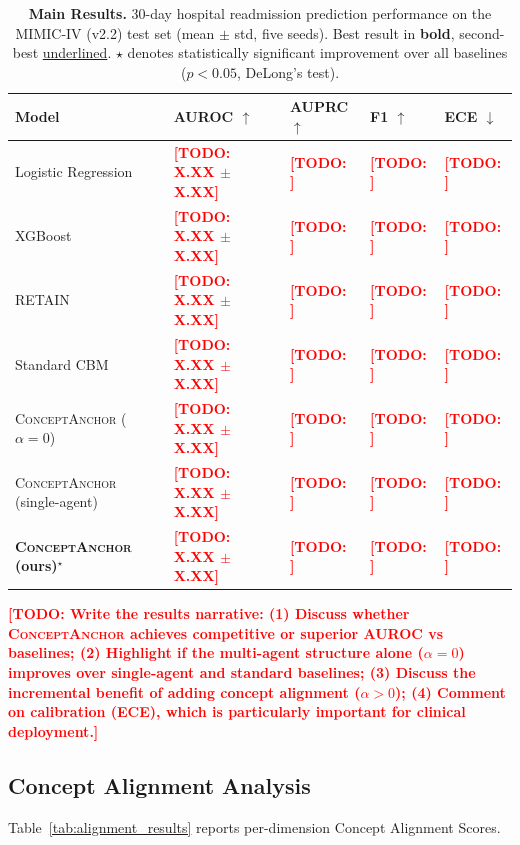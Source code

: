 \documentclass[review,12pt,authoryear]{elsarticle}
\newcommand{\todo}[1]{\textcolor{red}{\textbf{[TODO: #1]}}}
\newcommand{\modelname}{\textsc{ConceptAnchor}}
\newcommand{\dataset}{MIMIC-IV (v2.2)}
\begin{document}
\begin{table}[t]
  \centering
  \caption{\textbf{Main Results.}
  30-day hospital readmission prediction performance on the \dataset{} test set (mean $\pm$ std, five seeds).
  Best result in \textbf{bold}, second-best \underline{underlined}.
  $\star$ denotes statistically significant improvement over all baselines ($p < 0.05$, DeLong's test).}
  \label{tab:main_results}
  \begin{tabularx}{\textwidth}{lXXXX}
    \toprule
    \textbf{Model} & \textbf{AUROC} $\uparrow$ & \textbf{AUPRC} $\uparrow$ & \textbf{F1} $\uparrow$ & \textbf{ECE} $\downarrow$ \\
    \midrule
    Logistic Regression         & \todo{X.XX $\pm$ X.XX} & \todo{} & \todo{} & \todo{} \\
    XGBoost                     & \todo{X.XX $\pm$ X.XX} & \todo{} & \todo{} & \todo{} \\
    RETAIN                      & \todo{X.XX $\pm$ X.XX} & \todo{} & \todo{} & \todo{} \\
    Standard CBM                & \todo{X.XX $\pm$ X.XX} & \todo{} & \todo{} & \todo{} \\
    \modelname{} ($\alpha=0$)   & \todo{X.XX $\pm$ X.XX} & \todo{} & \todo{} & \todo{} \\
    \modelname{} (single-agent) & \todo{X.XX $\pm$ X.XX} & \todo{} & \todo{} & \todo{} \\
    \textbf{\modelname{} (ours)}$^\star$ & \todo{\textbf{X.XX $\pm$ X.XX}} & \todo{} & \todo{} & \todo{} \\
    \bottomrule
  \end{tabularx}
\end{table}

\todo{Write the results narrative: (1) Discuss whether \modelname{} achieves competitive or superior AUROC vs baselines; (2) Highlight if the multi-agent structure alone ($\alpha=0$) improves over single-agent and standard baselines; (3) Discuss the incremental benefit of adding concept alignment ($\alpha > 0$); (4) Comment on calibration (ECE), which is particularly important for clinical deployment.}

\subsection{Concept Alignment Analysis}

Table~\ref{tab:alignment_results} reports per-dimension Concept Alignment Scores.
\end{document}

